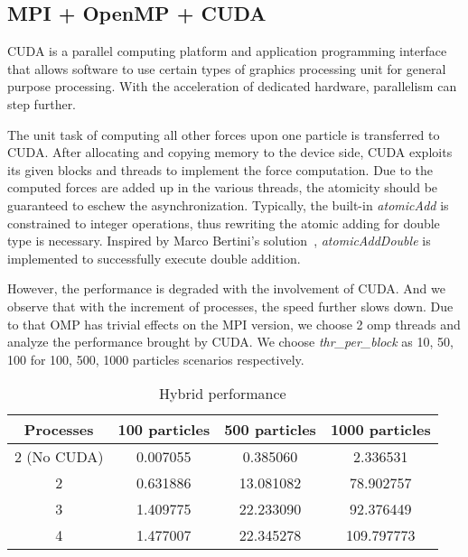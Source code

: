 \documentclass{scrartcl}
\begin{document}
\subsection{MPI + OpenMP + CUDA}
CUDA is a parallel computing platform and application programming interface that allows software to use certain types of graphics processing unit for general purpose processing. 
With the acceleration of dedicated hardware, parallelism can step further.  

\noindent The unit task of computing all other forces upon one particle is transferred to CUDA. 
After allocating and copying memory to the device side, CUDA exploits its given blocks and threads to implement the force computation.
Due to the computed forces are added up in the various threads, the atomicity should be guaranteed to eschew the asynchronization. 
Typically, the built-in \textit{atomicAdd} is constrained to integer operations, thus rewriting the atomic adding for double type is necessary.
Inspired by Marco Bertini's solution~\cite{atomicAdd}, \textit{atomicAddDouble} is implemented to successfully execute double addition.

\noindent However, the performance is degraded with the involvement of CUDA.
And we observe that with the increment of processes, the speed further slows down.
Due to that OMP has trivial effects on the MPI version, we choose 2 omp threads and analyze the performance brought by CUDA. 
We choose \textit{thr\_per\_block} as 10, 50, 100 for 100, 500, 1000 particles scenarios respectively.

\begin{table}
\footnotesize
    \centering
    \begin{tabular}{cccc}
    \hline
    Processes& 100 particles& 500 particles& 1000 particles\\
    \hline
    2 (No CUDA)& 0.007055& 0.385060& 2.336531\\ 
    2& 0.631886& 13.081082& 78.902757\\
    3& 1.409775& 22.233090& 92.376449\\
    4& 1.477007& 22.345278& 109.797773\\
    \hline
    \end{tabular}
    \caption{Hybrid performance}
    \label{tab:my_label}
\end{table}
\end{document}
